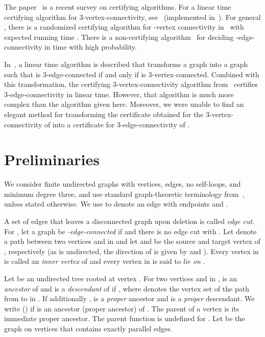 \documentclass[paper=a4]{scrartcl}
\begin{document}
The paper~\cite{McConnell2011} is a recent survey on certifying algorithms. For a linear time certifying algorithm for 3-vertex-connectivity, see~\cite{Schmidt2013} (implemented in~\cite{Neumann2011}). For general , there is a randomized certifying algorithm for -vertex connectivity in~\cite{Linial1988} with expected running time . There is a non-certifying algorithm~\cite{Karger2000} for deciding -edge-connectivity in time  with high probability.

In~\cite{Galil1991}, a linear time algorithm is described that transforms a graph  into a graph  such that  is 3-edge-connected if and only if  is 3-vertex-connected. Combined with this transformation, the certifying 3-vertex-connectivity algorithm from~\cite{Schmidt2013} certifies 3-edge-connectivity in linear time. However, that algorithm is much more complex than the algorithm given here. Moreover, we were unable to find an elegant method for transforming the certificate obtained for the 3-vertex-connectivity of  into a certificate for 3-edge-connectivity of .




\section{Preliminaries}\label{preliminaries}

We consider finite undirected graphs  with  vertices,  edges, no self-loops, and minimum degree three, and use standard graph-theoretic terminology from~\cite{Bondy2008}, unless stated otherwise. We use  to denote an edge with endpoints  and .

A set of edges that leaves a disconnected graph upon deletion is called \emph{edge cut}. For , let a graph  be \emph{-edge-connected} if  and there is no edge cut  with . Let  denote a path  between two vertices  and  in  and let  and  be the source and target vertex of , respectively (as  is undirected, the direction of  is given by  and ). Every vertex in  is called an \emph{inner vertex} of  and every vertex in  is said to \emph{lie on} .

Let  be an undirected tree rooted at vertex . For two vertices  and  in ,  is an \emph{ancestor} of  and  is a \emph{descendant} of  if , where  denotes the vertex set of the path from  to  in . If additionally ,  is a \emph{proper} ancestor and  is a \emph{proper} descendant. We write  () if  is an ancestor (proper ancestor) of . The parent  of a vertex  is its immediate proper ancestor. The parent function is undefined for . Let  be the graph on  vertices that contains exactly  parallel edges.
\end{document}
